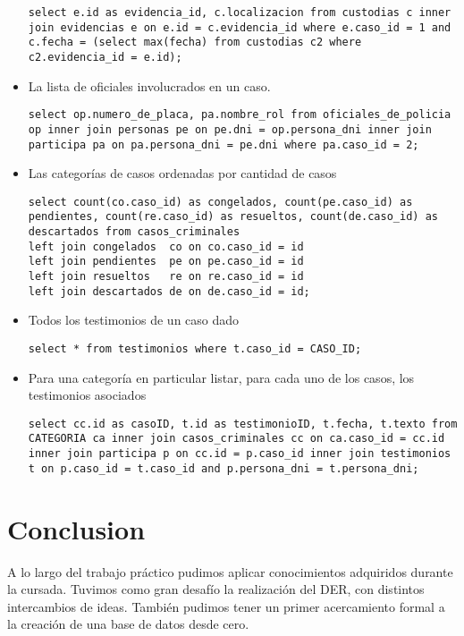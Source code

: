 \documentclass[10pt,a4paper]{article}
\begin{document}
\begin{itemize}
\begin{verbatim}
select e.id as evidencia_id, c.localizacion from custodias c inner join evidencias e on e.id = c.evidencia_id where e.caso_id = 1 and c.fecha = (select max(fecha) from custodias c2 where c2.evidencia_id = e.id);
\end{verbatim}
\item La lista de oficiales involucrados en un caso.
\begin{verbatim}
select op.numero_de_placa, pa.nombre_rol from oficiales_de_policia op inner join personas pe on pe.dni = op.persona_dni inner join participa pa on pa.persona_dni = pe.dni where pa.caso_id = 2;
\end{verbatim}
\item Las categorías de casos ordenadas por cantidad de casos
\begin{verbatim}
select count(co.caso_id) as congelados, count(pe.caso_id) as pendientes, count(re.caso_id) as resueltos, count(de.caso_id) as descartados from casos_criminales 
left join congelados  co on co.caso_id = id 
left join pendientes  pe on pe.caso_id = id 
left join resueltos   re on re.caso_id = id 
left join descartados de on de.caso_id = id;
\end{verbatim}
\item Todos los testimonios de un caso dado
\begin{verbatim}
select * from testimonios where t.caso_id = CASO_ID;
\end{verbatim}
\item Para una categoría en particular listar, para cada uno de los casos, los testimonios
asociados
\begin{verbatim}
select cc.id as casoID, t.id as testimonioID, t.fecha, t.texto from CATEGORIA ca inner join casos_criminales cc on ca.caso_id = cc.id inner join participa p on cc.id = p.caso_id inner join testimonios t on p.caso_id = t.caso_id and p.persona_dni = t.persona_dni;
\end{verbatim}
\end{itemize}

\section{Conclusion}
A lo largo del trabajo práctico pudimos aplicar conocimientos adquiridos durante la cursada. Tuvimos como gran desafío la realización del DER, con distintos intercambios de ideas. También pudimos tener un primer acercamiento formal a la creación de una base de datos desde cero. 
\end{document}
